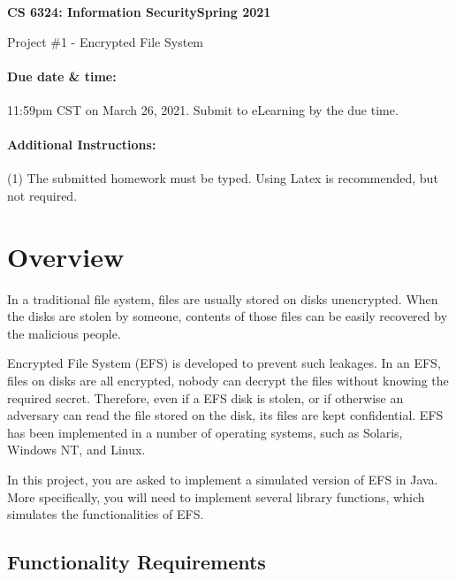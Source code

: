 \documentclass[11pt]{article}
\begin{document}
\thispagestyle{empty}

\noindent \textbf{CS 6324: Information Security\hspace*{\fill}Spring 2021}
\begin{center}
{\LARGE Project \#1 - Encrypted File System}
\end{center}

\paragraph{Due date \& time:} 11:59pm CST on March 26, 2021.
Submit to eLearning by the due time.


\vspace*{-0.1in}\paragraph{Additional Instructions:} (1) The submitted homework must be typed. Using Latex is recommended, but
not required.
\\


\section{Overview}
In a traditional file system, files are usually stored on disks unencrypted. When the disks are stolen by someone, contents of those files can be easily recovered by the malicious people.

Encrypted File System (EFS) is developed to prevent such leakages.  In an EFS, files on disks are all encrypted, nobody can decrypt the files without knowing the required secret.  Therefore, even if a EFS disk is stolen, or if otherwise an adversary can read the file stored on the disk, its files are kept confidential.  EFS has been implemented in a number of operating systems, such as Solaris, Windows NT, and Linux.

In this project, you are asked to implement a simulated version of EFS in Java.  More specifically, you will need to implement several library functions, which simulates the functionalities of EFS.


\subsection{Functionality Requirements} \label{sec:fun}
\end{document}
